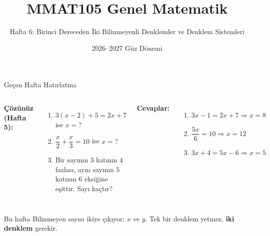 \documentclass[aspectratio=169,11pt]{beamer}
\title[MMAT105 -- Hafta 6]{MMAT105 Genel Matematik}
\subtitle{Hafta 6: Birinci Dereceden İki Bilinmeyenli Denklemler ve Denklem Sistemleri}
\author{}
\date{2026--2027 Güz Dönemi}
\begin{document}
\begin{frame}
\titlepage
\end{frame}


\begin{frame}{Geçen Hafta Hatırlatma}
\begin{columns}[t]
\textbf{Çözünüz (Hafta 5):}
\begin{enumerate}
\item \(3(x-2)+5=2x+7\) ise \(x=?\)
\item \(\dfrac{x}{2}+\dfrac{x}{3}=10\) ise \(x=?\)
\item Bir sayının \(3\) katının \(4\) fazlası, aynı sayının \(5\) katının \(6\) eksiğine eşittir. Sayı kaçtır?
\end{enumerate}
\pause
\textbf{Cevaplar:}
\begin{enumerate}
\item \(3x-1=2x+7\Rightarrow x=8\)
\item \(\dfrac{5x}{6}=10\Rightarrow x=12\)
\item \(3x+4=5x-6\Rightarrow x=5\)
\end{enumerate}
\end{columns}
\vspace{6pt}
\begin{block}{Bu hafta}
Bilinmeyen sayısı ikiye çıkıyor: \(x\) ve \(y\). Tek bir denklem yetmez, \textbf{iki denklem} gerekir.
\end{block}
\end{frame}
\end{document}
